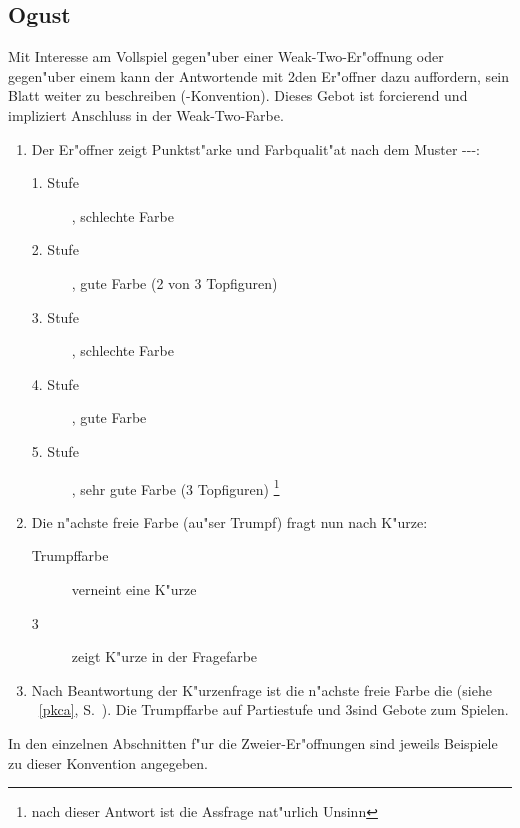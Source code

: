 \subsection{Ogust} \label{ogust}

Mit Interesse am Vollspiel gegen"uber einer Weak-Two-Er"offnung oder gegen"uber
einem  kann der Antwortende mit 2\SA den Er"offner dazu
auffordern, sein Blatt weiter zu beschreiben (-Konvention). Dieses
Gebot ist forcierend und impliziert Anschluss in der Weak-Two-Farbe.
\begin{enumerate}
\item Der Er"offner zeigt Punktst"arke und Farbqualit"at nach dem Muster
\mini{}-\mini{}-\maxi{}-\maxi:
	\begin{description}
	\item[1. Stufe] \mini, schlechte Farbe
	\item[2. Stufe] \mini, gute Farbe (2 von 3 Topfiguren)
	\item[3. Stufe] \maxi, schlechte Farbe
	\item[4. Stufe] \maxi, gute Farbe
	\item[5. Stufe] \maxi, sehr gute Farbe (3 Topfiguren)%
	  \footnote{nach dieser Antwort ist die Assfrage nat"urlich Unsinn}
	\end{description}
\item Die n"achste freie Farbe (au"ser Trumpf) fragt nun nach K"urze:
	\begin{description}
	\item[Trumpffarbe] verneint eine K"urze
	\item[3\SA{}] zeigt K"urze in der Fragefarbe
	\end{description}
\item Nach Beantwortung der K"urzenfrage ist die n"achste freie Farbe die
 (siehe ~\ref{pkca}, S.~\pageref{pkca}).  Die Trumpffarbe
auf Partiestufe und 3\SA sind Gebote zum Spielen.
\end{enumerate}

In den einzelnen Abschnitten f"ur die Zweier-Er"offnungen sind jeweils Beispiele
zu dieser Konvention angegeben.

